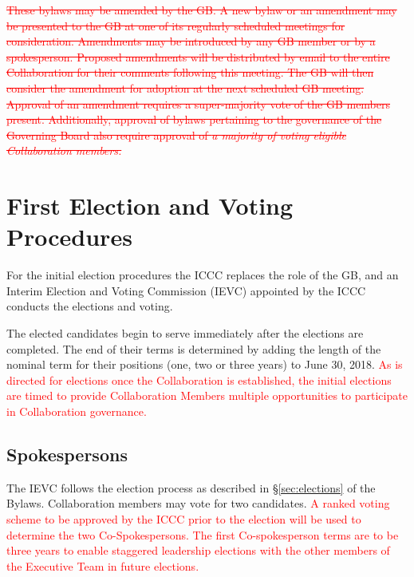 \documentclass[12pt]{article}
\begin{document}
\textcolor{red} {\sout{
These bylaws may be amended by the GB. A new bylaw or an amendment may be presented to the GB at one of its regularly scheduled meetings for consideration. Amendments may be introduced by any GB member or by a spokesperson. Proposed amendments will be distributed by email to the entire Collaboration for their comments following this meeting. The GB will then consider the amendment for adoption at the next scheduled GB meeting. Approval of an amendment requires a super-majority vote of the GB members present. Additionally, approval of bylaws pertaining to the governance of the Governing Board also require approval of  {\it a majority of voting eligible Collaboration members.}
}}




\appendix
\appendixpage
\addappheadtotoc  %



\section{First Election and Voting Procedures}
\label{app:first_election}

For the initial election procedures the ICCC replaces the role of the GB, and an Interim Election and Voting Commission (IEVC) appointed by the ICCC conducts the elections and voting.  

The elected candidates begin to serve immediately after the elections are completed. The end of their terms is determined by adding the length of the nominal term for their positions (one, two or three years) to June 30, 2018. 
\textcolor{red}{As is directed for elections once the Collaboration is established, the initial elections are timed to provide Collaboration Members multiple opportunities to participate in Collaboration governance. }

\subsection{Spokespersons} 
The IEVC follows the election process as described in \S\ref{sec:elections} of the Bylaws.  Collaboration members may vote for two candidates.  \textcolor{red}{A ranked voting scheme to be approved by the ICCC prior to the election will be used to determine the two Co-Spokespersons. 
The first Co-spokesperson terms are to be three years to enable staggered leadership elections with the other members of the Executive Team in future elections. }
\end{document}
